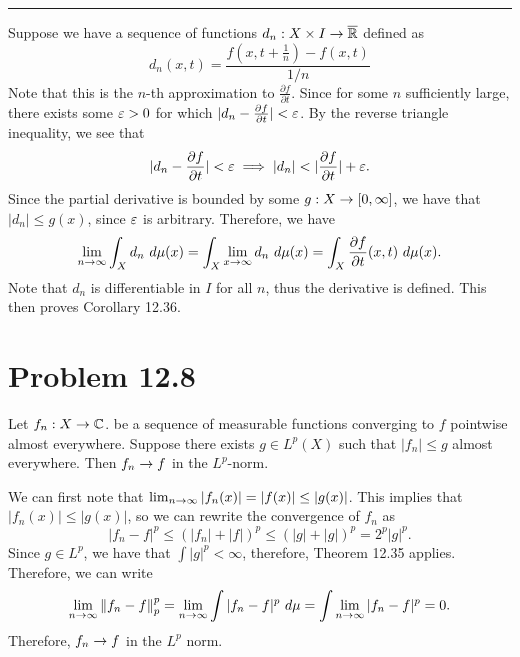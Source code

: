 \begin{solution}
\begin{quote}
        \end{quote}
    \vspace{-10mm}
    \begin{center}\rule{16.5cm}{0.5pt}\end{center}

    \newpage
    Suppose we have a sequence of functions $d_n : X \times I \rightarrow \overline{\mathbb{R}}$ defined as
    \[d_n(x, t) = \frac{f(x, t + \frac{1}{n}) - f(x, t)}{1 / n}\]
    Note that this is the $n$-th approximation to $\frac{\partial f}{\partial t}$. Since for some $n$ sufficiently large, there exists some $\varepsilon > 0$ for which $|d_n - \frac{\partial f}{\partial t}| < \varepsilon$. By the reverse triangle inequality, we see that 
    \[|d_n - \frac{\partial f}{\partial t}| < \varepsilon \implies |d_n| < |\frac{\partial f}{\partial t}| + \varepsilon.\]
    Since the partial derivative is bounded by some $g: X \rightarrow [0, \infty]$, we have that $|d_n| \leq g(x)$, since $\varepsilon$ is arbitrary. Therefore, we have 
    \[\lim_{n \into \infty}\int_X d_n \ d\mu(x) = \int_X \lim_{x \into \infty} d_n \ d\mu(x) = \int_X \frac{\partial f}{\partial t}(x, t) \ d\mu(x).\]
    Note that $d_n$ is differentiable in $I$ for all $n$, thus the derivative is defined. This then proves Corollary 12.36. 
\end{solution}


\newpage
\section{Problem 12.8}
Let $f_n : X \rightarrow \mathbb{C}$. be a sequence of measurable functions converging to $f$ pointwise almost everywhere. Suppose there exists $g \in L^p(X)$ such that $|f_n| \leq g$ almost everywhere. Then $f_n \rightarrow f$ in the $L^p$-norm. 
\partbreak
\begin{solution}

    We can first note that $\lim_{n \rightarrow \infty} |f_n(x)| = |f(x)| \leq |g(x)|$. This implies that $|f_n(x)| \leq |g(x)|$, so we can rewrite the convergence of $f_n$ as
    \[|f_n - f|^p \leq (|f_n| + |f|)^p \leq (|g| + |g|)^p = 2^p|g|^p.\]
    Since $g \in L^p$, we have that $\int |g|^p < \infty$, therefore, Theorem 12.35 applies. Therefore, we can write
    \[\lim_{n \rightarrow \infty} \norm{f_n - f}_p^p = \lim_{n \rightarrow \infty} \int |f_n - f|^p \ d\mu = \int \lim_{n \rightarrow \infty} |f_n - f|^p = 0.\]
    Therefore, $f_n \rightarrow f$ in the $L^p$ norm.
\end{solution}


\newpage
